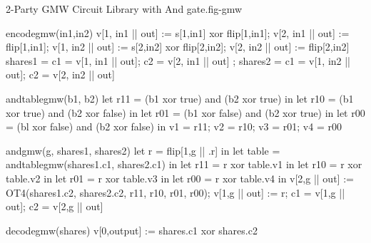 \begin{fpfig}[t]{2-Party GMW Circuit Library with And gate.}{fig-gmw}
{\footnotesize
  \begin{verbatimtab}
    encodegmw(in1,in2)
    {
      v[1, in1 || out] := s[1,in1] xor flip[1,in1];
      v[2, in1 || out] := flip[1,in1];
      v[1, in2 || out] := s[2,in2] xor flip[2,in2];
      v[2, in2 || out] := flip[2,in2]
      { shares1 = { c1 = v[1, in1 || out]; c2 = v[2, in1 || out] };
        shares2 = { c1 = v[1, in2 || out]; c2 = v[2, in2 || out]} } 
    }
    
    andtablegmw(b1, b2)
    {
      let r11 = (b1 xor true) and (b2 xor true) in
      let r10 = (b1 xor true) and (b2 xor false) in
      let r01 = (b1 xor false) and (b2 xor true) in
      let r00 = (bl xor false) and (b2 xor false) in
      { v1 = r11; v2 = r10; v3 = r01; v4 = r00 }
    }
    
    andgmw(g, shares1, shares2)
    {
      let r = flip[1,g || .r] in
      let table = andtablegmw(shares1.c1, shares2.c1) in
      let r11 =  r xor table.v1 in
      let r10 =  r xor table.v2 in
      let r01 =  r xor table.v3 in
      let r00 =  r xor table.v4 in
      v[2,g || out] := OT4(shares1.c2, shares2.c2, r11, r10, r01, r00);
      v[1,g || out] := r;
      { c1 = v[1,g || out]; c2 = v[2,g || out]}
    }
    
    decodegmw(shares) { v[0,output] := shares.c1 xor shares.c2 }
  \end{verbatimtab}
}
\end{fpfig}
